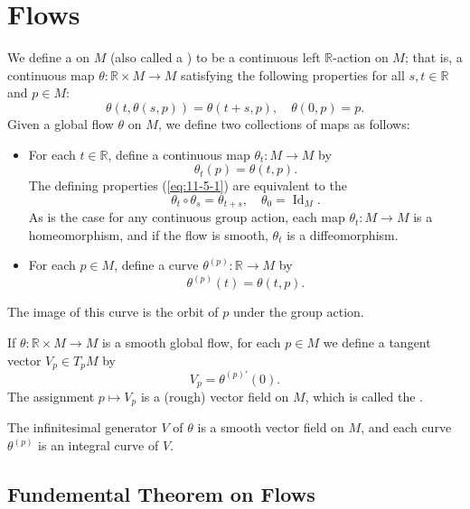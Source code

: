 \documentclass[../main.tex]{subfiles}
\begin{document}
\section{Flows}
\begin{definition}{}{}
     We define a  on $M$ (also called a ) to be a continuous left $\mathbb{R}$-action on $M$; that is, a continuous map $\theta: \mathbb{R} \times M \to M$ satisfying the following properties for all $s, t \in \mathbb{R}$ and $p \in M$:
\begin{equation}\label{eq:11-5-1}
\theta(t, \theta(s, p)) = \theta(t+s, p), \quad \theta(0, p) = p.
\end{equation}
Given a global flow $\theta$ on $M$, we define two collections of maps as follows:
\begin{itemize}
\item For each $t \in \mathbb{R}$, define a continuous map $\theta_t: M \to M$ by
\[
\theta_t(p) = \theta(t, p).
\]
The defining properties (\ref{eq:11-5-1}) are equivalent to the 
\begin{equation}
\theta_t \circ \theta_s = \theta_{t+s}, \quad \theta_0 = \operatorname{Id}_M.
\end{equation}
As is the case for any continuous group action, each map $\theta_t: M \to M$ is a homeomorphism, and if the flow is smooth, $\theta_t$ is a diffeomorphism.
\item For each $p \in M$, define a curve $\theta^{(p)}: \mathbb{R} \to M$ by
\[
\theta^{(p)}(t) = \theta(t, p).
\]
\end{itemize}
The image of this curve is the orbit of $p$ under the group action.
\end{definition}

\begin{proposition}{}{}


If $\theta: \mathbb{R} \times M \to M$ is a smooth global flow, for each $p \in M$ we define a tangent vector $V_p \in T_p M$ by
\[
V_p = \theta^{(p)'}(0).
\]
The assignment $p \mapsto V_p$ is a (rough) vector field on $M$, which is called the .



 The infinitesimal generator $V$ of $\theta$ is a smooth vector field on $M$, and each curve $\theta^{(p)}$ is an integral curve of $V$.
\end{proposition}

\subsection{Fundemental Theorem on Flows}
\end{document}
